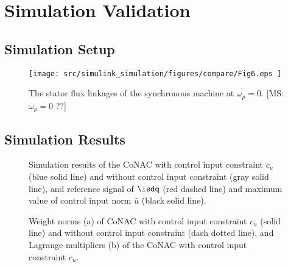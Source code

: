 \documentclass[conference]{IEEEtran}
\newcommand{\MSRY}[1]{{\color{red} [MS: #1]}} %
\begin{document}
\section{Simulation Validation}

\subsection{Simulation Setup}

\begin{figure}[!t]
	\centering
	\texttt{[image: 
		src/simulink\_simulation/figures/compare/Fig6.eps
		]}
	\caption{
		The stator flux linkages of the synchronous machine at $\omega_p=0$.
		\MSRY{$\omega_p=0$ ??}
	}
	\label{fig:model_param}
\end{figure}

\subsection{Simulation Results}

\begin{figure}[!t]
    \centering
	\vspace{1mm}
	\vspace{1mm}
    \caption{
		Simulation results of the CoNAC with control input constraint $c_u$ (blue solid line) and without control input constraint (gray solid line), and reference signal of $\isdq$ (red dashed line) and maximum value of control input norm $\bar u$ (black solid line). 
	}
	
	\label{fig:ctrl_result1}
\end{figure}

\begin{figure}[!t]
    \centering
	\vspace{1mm}
    \caption{
		Weight norms (a) of CoNAC with control input constraint $c_u$ (solid line) and without control input constraint (dash dotted line), and Lagrange multipliers (b) of the CoNAC with control input constraint $c_u$.
	}
	\label{fig:ctrl_result2}
\end{figure}
\end{document}
